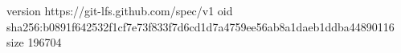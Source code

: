 version https://git-lfs.github.com/spec/v1
oid sha256:b0891f642532f1cf7e73f833f7d6cd1d7a4759ee56ab8a1daeb1ddba44890116
size 196704
